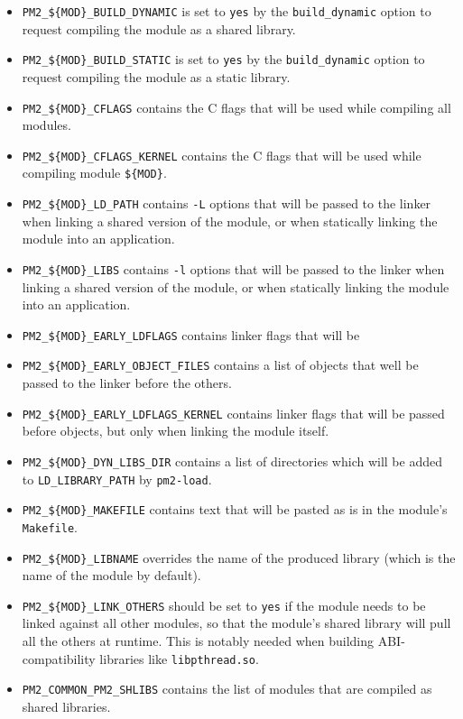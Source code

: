 \documentclass[11pt, a4paper ,twoside]{article}
\begin{document}
\begin{itemize}
\item \verb+PM2_${MOD}_BUILD_DYNAMIC+ is set to \verb+yes+ by the
\verb+build_dynamic+ option to request compiling the module as a shared
library.
\item \verb+PM2_${MOD}_BUILD_STATIC+ is set to \verb+yes+ by the
\verb+build_dynamic+ option to request compiling the module as a static
library.
\item \verb+PM2_${MOD}_CFLAGS+ contains the C flags that will be used
while compiling all modules.
\item \verb+PM2_${MOD}_CFLAGS_KERNEL+ contains the C flags that will be
used while compiling module \verb+${MOD}+.
\item \verb+PM2_${MOD}_LD_PATH+ contains \verb+-L+ options that will be
passed to the linker when linking a shared version of the module, or
when statically linking the module into an application.
\item \verb+PM2_${MOD}_LIBS+ contains \verb+-l+ options that will be
passed to the linker when linking a shared version of the module, or
when statically linking the module into an application.
\item \verb+PM2_${MOD}_EARLY_LDFLAGS+ contains linker flags that will be
\item \verb+PM2_${MOD}_EARLY_OBJECT_FILES+ contains a list of objects
that well be passed to the linker before the others.
\item \verb+PM2_${MOD}_EARLY_LDFLAGS_KERNEL+ contains linker flags that
will be passed before objects, but only when linking the module itself.
\item \verb+PM2_${MOD}_DYN_LIBS_DIR+ contains a list of directories
which will be added to \verb+LD_LIBRARY_PATH+ by \verb+pm2-load+.
\item \verb+PM2_${MOD}_MAKEFILE+ contains text that will be pasted as is
in the module's \verb+Makefile+.
\item \verb+PM2_${MOD}_LIBNAME+ overrides the name of the produced
library (which is the name of the module by default).
\item \verb+PM2_${MOD}_LINK_OTHERS+ should be set to \verb+yes+ if the
module needs to be linked against all other modules, so that the
module's shared library will pull all the others at runtime.  This is
notably needed when building ABI-compatibility libraries like
\verb+libpthread.so+.
\item \verb+PM2_COMMON_PM2_SHLIBS+ contains the list of modules that are
compiled as shared libraries.

\end{itemize}
\end{document}
